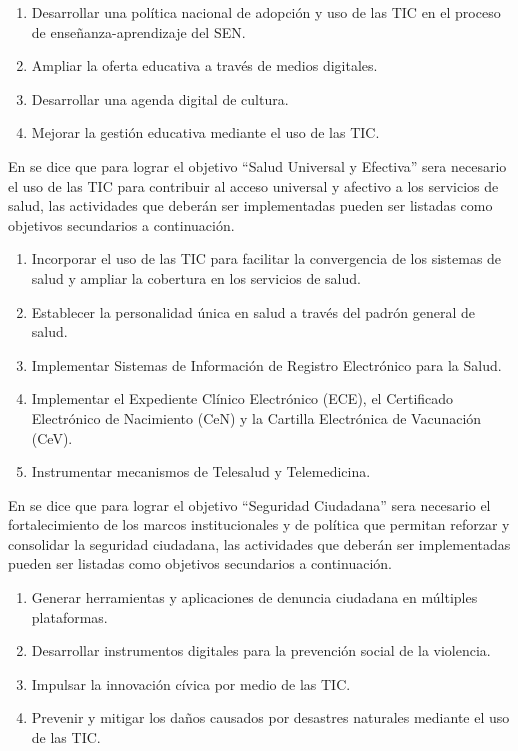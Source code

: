 \documentclass[runningheads,a4paper]{llncs}
\begin{document}
\begin{enumerate}
	\item Desarrollar una política nacional de adopción y uso de las \gls{TIC} en el proceso de enseñanza-aprendizaje del \gls{SEN}.
	\item Ampliar la oferta educativa a través de medios digitales.
	\item Desarrollar una agenda digital de cultura.
	\item Mejorar la gestión educativa mediante el uso de las \gls{TIC}.
\end{enumerate}

En \cite{EDN_1} se dice que para lograr el objetivo ``Salud Universal y Efectiva'' sera necesario el uso de las \gls{TIC} para contribuir al acceso universal y afectivo a los servicios de salud, las actividades que deberán ser implementadas pueden ser listadas como objetivos secundarios a continuación.

\begin{enumerate}
	\item Incorporar el uso de las \gls{TIC} para facilitar la convergencia de los sistemas de salud y ampliar la cobertura en los servicios de salud.
	\item Establecer la personalidad única en salud a través del padrón general de salud.
	\item Implementar Sistemas de Información de Registro Electrónico para la Salud.
	\item Implementar el Expediente Clínico Electrónico (ECE), el Certificado Electrónico de Nacimiento (CeN) y la Cartilla Electrónica de Vacunación (CeV).
	\item Instrumentar mecanismos de Telesalud y Telemedicina.
\end{enumerate}

En \cite{EDN_1} se dice que para lograr el objetivo ``Seguridad Ciudadana'' sera necesario el fortalecimiento de los marcos institucionales y de política que permitan reforzar y consolidar la seguridad ciudadana, las actividades que deberán ser implementadas pueden ser listadas como objetivos secundarios a continuación.

\begin{enumerate}
	\item Generar herramientas y aplicaciones de denuncia ciudadana en múltiples plataformas.
	\item Desarrollar instrumentos digitales para la prevención social de la violencia.
	\item Impulsar la innovación cívica por medio de las \gls{TIC}.
	\item Prevenir y mitigar los daños causados por desastres naturales mediante el uso de las \gls{TIC}.
\end{enumerate}
\end{document}

